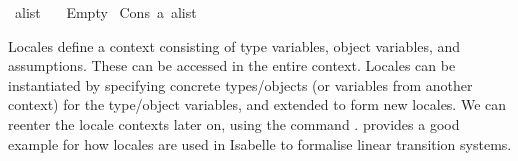 \begin{isabellebody}
\begin{isamarkuptext}
\end{isamarkuptext}\isamarkuptrue%
\isamarkupfalse%
\ {\isacharparenleft}{\kern0pt}{\isacharprime}{\kern0pt}a{\isacharparenright}{\kern0pt}list\ {\isacharequal}{\kern0pt}\isanewline
\ \ Empty\isanewline
{\isacharbar}{\kern0pt}\ Cons\ {\isacartoucheopen}{\isacharprime}{\kern0pt}a{\isacartoucheclose}\ {\isacartoucheopen}{\isacharparenleft}{\kern0pt}{\isacharprime}{\kern0pt}a{\isacharparenright}{\kern0pt}list{\isacartoucheclose}%
\isadelimdocument
%
\endisadelimdocument
%
\isatagdocument
%
\isamarkuptrue%
%
\endisatagdocument
{\isafolddocument}%
%
\isadelimdocument
%
\endisadelimdocument
%
\begin{isamarkuptext}%
Locales define a context consisting of type variables, object variables, and assumptions. These can be accessed in the entire context. Locales can be instantiated by specifying concrete types/objects (or variables from another context) for the type/object variables, and extended to form new locales. We can reenter the locale contexts later on, using the command .  provides a good example for how locales are used in Isabelle to formalise linear transition systems.%
\end{isamarkuptext}\isamarkuptrue%
%
\isadelimtheory
%
\endisadelimtheory
%
\isatagtheory
%
\endisatagtheory
{\isafoldtheory}%
%
\isadelimtheory
%
\endisadelimtheory
%
\end{isabellebody}%
\endinput
